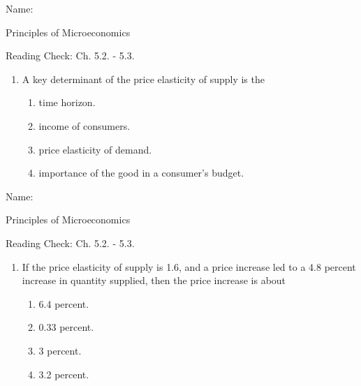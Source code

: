 \documentclass{article}
\begin{document}
\newpage

Name: \underline{\phantom{xxxxxxxxxxxxxxxxxxxxxxxxxxxxxxxxxxxxxxxx}}

Principles of Microeconomics

Reading Check: Ch. 5.2. - 5.3.

\begin{enumerate}

\item A key determinant of the price elasticity of supply is the

	\begin{enumerate}
	
	\item time horizon.
	
	\item income of consumers.
	
	\item price elasticity of demand.
	
	\item importance of the good in a consumer's budget.
	
	\end{enumerate}
	
\end{enumerate}

\bigskip

Name: \underline{\phantom{xxxxxxxxxxxxxxxxxxxxxxxxxxxxxxxxxxxxxxxx}}

Principles of Microeconomics

Reading Check: Ch. 5.2. - 5.3.

\begin{enumerate}

\item If the price elasticity of supply is 1.6, and a price increase led to a 4.8 percent increase in quantity supplied, then the price increase is about

	\begin{enumerate}
	
	\item 6.4 percent.
	
	\item 0.33 percent.
	
	\item 3 percent.
	
	\item 3.2 percent.
	
	\end{enumerate}
	
\end{enumerate}
\end{document}
